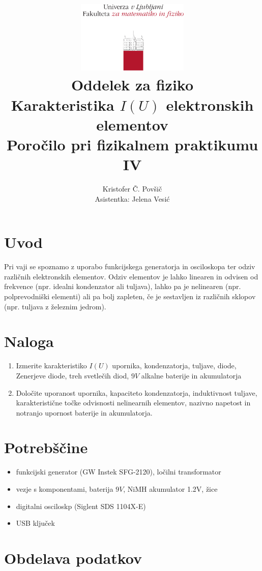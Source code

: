 \documentclass[12pt]{report}
\title{
  \includegraphics[width=0.4\textwidth]{fmf_logo}\\
  {\small Oddelek za fiziko} \\
  {Karakteristika $I(U)$ elektronskih elementov}\\
  {\small Poročilo pri fizikalnem praktikumu IV}\\

}
\date{}
\author{ Kristofer Č. Povšič \\[5 cm]
 \small  Asistentka: Jelena Vesić
}
\begin{document}
\setcounter{page}{2}

\maketitle

\chapter*{Uvod}

Pri vaji se spoznamo z uporabo funkcijskega generatorja in osciloskopa ter odziv različnih elektronskih elementov. Odziv elementov je lahko linearen in odvisen od frekvence (npr. idealni kondenzator ali tuljava), lahko pa je nelinearen (npr. polprevodniški elementi) ali pa bolj zapleten, če je sestavljen iz različnih sklopov (npr. tuljava z železnim jedrom). 

\chapter*{Naloga}
\begin{enumerate}
  \item Izmerite karakteristiko $I(U)$ upornika, kondenzatorja, tuljave, diode, Zenerjeve diode, treh svetlečih diod, $9\si{V}$ alkalne baterije in akumulatorja
  \item Določite uporanost upornika, kapaciteto kondenzatorja, induktivnost tuljave, karakteristične točke odvisnosti nelinearnih elementov, nazivno napetost in notranjo upornost baterije in akumulatorja. 
\end{enumerate}


\begingroup
\let\clearpage\relax

\chapter*{Potrebščine}
\begin{itemize}
  \item funkcijski generator (GW Instek SFG-2120), ločilni transformator
  \item vezje s komponentami, baterija $9\si{V}$, NiMH akumulator 1.2V, žice
  \item digitalni osciloskp (Siglent SDS 1104X-E)
  \item USB ključek
\end{itemize}

\chapter*{Obdelava podatkov}
\end{document}
